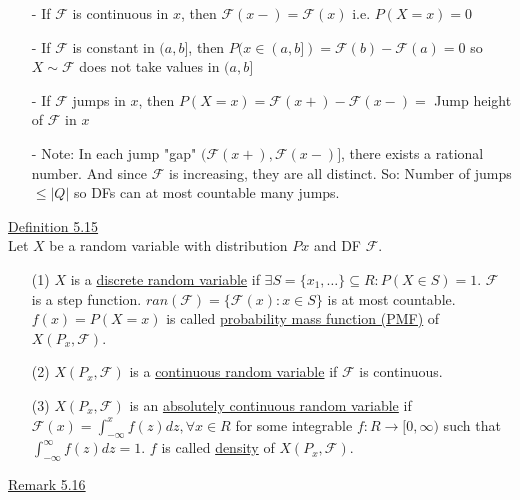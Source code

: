 \documentclass[10pt,letterpaper]{article}
\begin{document}
\begin{enumerate}

\item[-] If $\mathcal{F}$ is continuous in $x$, then $\mathcal{F}(x-)=\mathcal{F}(x)$ i.e. $P(X=x)=0$

\item[-] If $\mathcal{F}$ is constant in $(a,b]$, then $P(x\in (a,b])=\mathcal{F}(b)-\mathcal{F}(a)=0$ so $X\sim\mathcal{F}$ does not take values in $(a,b]$

\item[-] If $\mathcal{F}$ jumps in $x$, then $P(X=x)=\mathcal{F}(x+)-\mathcal{F}(x-)=$ Jump height of $\mathcal{F}$ in $x$

\item[-] Note: In each jump "gap" $(\mathcal{F}(x+),\mathcal{F}(x-)]$, there exists a rational number. And since $\mathcal{F}$ is increasing, they are all distinct. So: Number of jumps $\leq |Q|$ so DFs can at most countable many jumps.

\end{enumerate}

\underline{Definition 5.15}\\

Let $X$ be a random variable with distribution $Px$ and DF $\mathcal{F}$.

\begin{enumerate}

\item[(1)] $X$ is a \underline{discrete random variable} if $\exists S=\{x_1, \dots\}\subseteq R: P(X\in S)=1$. $\mathcal{F}$ is a step function. $ran(\mathcal{F})=\{\mathcal{F}(x):x\in S\}$ is at most countable. $f(x)=P(X=x)$ is called \underline{probability mass function (PMF)} of $X(P_x, \mathcal{F})$.

\item[(2)] $X(P_x, \mathcal{F})$ is a \underline{continuous random variable} if $\mathcal{F}$ is continuous.

\item[(3)] $X(P_x, \mathcal{F})$ is an \underline{absolutely continuous random variable} if $\mathcal{F}(x)=\int_{-\infty}^xf(z)dz,\forall x\in R$ for some integrable $f:R\rightarrow [0,\infty)$ such that $\int_{-\infty}^{\infty}f(z)dz=1$. $f$ is called \underline{density} of $X(P_x, \mathcal{F})$.

\end{enumerate}

\underline{Remark 5.16}\\
\end{document}
